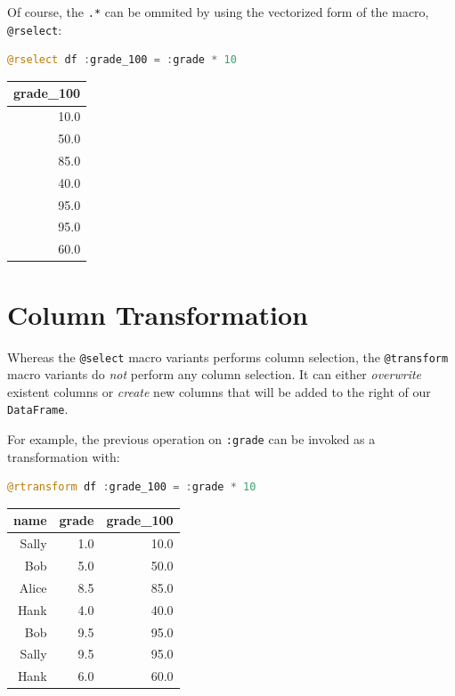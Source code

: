 \documentclass[
  notoc %
]{tufte-book}
\newcommand{\passthrough}[1]{#1}
\begin{document}
Of course, the \passthrough{\lstinline!.*!} can be ommited by using the
vectorized form of the macro, \passthrough{\lstinline!@rselect!}:

\begin{lstlisting}[language=Julia]
@rselect df :grade_100 = :grade * 10
\end{lstlisting}

\begin{longtable}[]{@{}r@{}}
\toprule
grade\_100 \\
\midrule
\endhead
10.0 \\
50.0 \\
85.0 \\
40.0 \\
95.0 \\
95.0 \\
60.0 \\
\bottomrule
\end{longtable}

\hypertarget{sec:dataframesmeta_transform}{%
\section{Column Transformation}\label{sec:dataframesmeta_transform}}

Whereas the \passthrough{\lstinline!@select!} macro variants performs
column selection, the \passthrough{\lstinline!@transform!} macro
variants do \emph{not} perform any column selection. It can either
\emph{overwrite} existent columns or \emph{create} new columns that will
be added to the right of our \passthrough{\lstinline!DataFrame!}.

For example, the previous operation on \passthrough{\lstinline!:grade!}
can be invoked as a transformation with:

\begin{lstlisting}[language=Julia]
@rtransform df :grade_100 = :grade * 10
\end{lstlisting}

\begin{longtable}[]{@{}rrr@{}}
\toprule
name & grade & grade\_100 \\
\midrule
\endhead
Sally & 1.0 & 10.0 \\
Bob & 5.0 & 50.0 \\
Alice & 8.5 & 85.0 \\
Hank & 4.0 & 40.0 \\
Bob & 9.5 & 95.0 \\
Sally & 9.5 & 95.0 \\
Hank & 6.0 & 60.0 \\
\bottomrule
\end{longtable}
\end{document}
